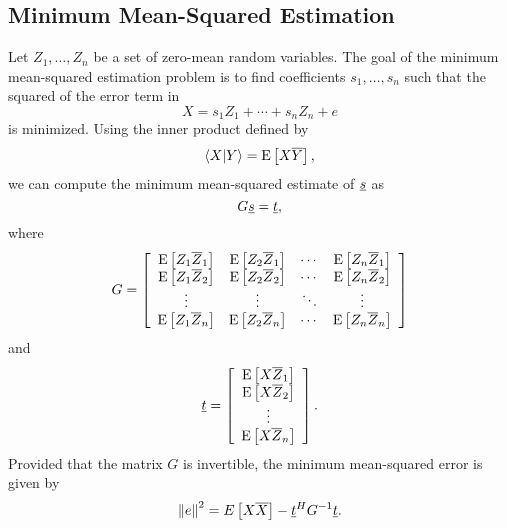 \subsection{Minimum Mean-Squared Estimation}

Let $Z_1, \ldots, Z_n$ be a set of zero-mean random variables.
The goal of the minimum mean-squared estimation problem is to find coefficients $s_1, \ldots, s_n$ such that the squared of the error term in
\begin{equation*}
X = s_1 Z_1 + \cdots + s_n Z_n + e
\end{equation*}
is minimized.
Using the inner product defined by
\begin{equation} \label{equation:ExpectationInnerProduct}
\left\langle X | Y \right\rangle = \mathrm{E} \left[ X \overline{Y} \right],
\end{equation}
we can compute the minimum mean-squared estimate of $\underline{s}$ as
\begin{equation*}
G \underline{s} = \underline{t},
\end{equation*}
where
\begin{equation*}
G = \left[ \begin{array}{cccc}
\mathrm{E} \left[ Z_1 \overline{Z}_1 \right]
& \mathrm{E} \left[ Z_2 \overline{Z}_1 \right] & \cdots
& \mathrm{E} \left[ Z_n \overline{Z}_1 \right] \\
\mathrm{E} \left[ Z_1 \overline{Z}_2 \right]
& \mathrm{E} \left[ Z_2 \overline{Z}_2 \right] & \cdots
& \mathrm{E} \left[ Z_n \overline{Z}_2 \right] \\
\vdots & \vdots & \ddots & \vdots \\
\mathrm{E} \left[ Z_1 \overline{Z}_n \right]
& \mathrm{E} \left[ Z_2 \overline{Z}_n \right] & \cdots
& \mathrm{E} \left[ Z_n \overline{Z}_n \right] \\
\end{array} \right]
\end{equation*}
and
\begin{equation*}
\underline{t} = \left[ \begin{array}{c}
\mathrm{E} \left[ X \overline{Z}_1 \right] \\
\mathrm{E} \left[ X \overline{Z}_2 \right] \\ \vdots \\
\mathrm{E} \left[ X \overline{Z}_n \right] \end{array} \right] .
\end{equation*}
Provided that the matrix $G$ is invertible, the minimum mean-squared error is given by
\begin{equation*}
\left\| e \right\|^2 = E \left[ X \overline{X} \right]
- \underline{t}^H G^{-1} \underline{t} .
\end{equation*}



